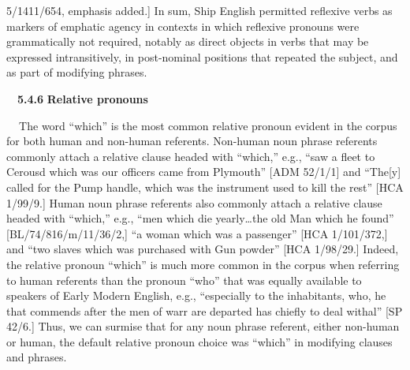 \begin{styleStandard}
5/1411/654, emphasis added.] In sum, Ship English permitted reflexive verbs as markers of emphatic agency in contexts in which reflexive pronouns were grammatically not required, notably as direct objects in verbs that may be expressed intransitively, in post-nominal positions that repeated the subject, and as part of modifying phrases. 
\end{styleStandard}


\begin{styleStandard}
\ \ \textbf{5.4.6} \textbf{Relative pronouns}
\end{styleStandard}


\begin{styleStandard}
\textbf{\ \ }The word “which” is the most common relative pronoun evident in the corpus for both human and non-human referents. Non-human noun phrase referents commonly attach a relative clause headed with “which,” e.g., “saw a fleet to Cerousd which was our officers came from Plymouth” [ADM 52/1/1] and “The[y] called for the Pump handle, which was the instrument used to kill the rest” [HCA 1/99/9.] Human noun phrase referents also commonly attach a relative clause headed with “which,” e.g., “men which die yearly…the old Man which he found” [BL/74/816/m/11/36/2,] “a woman which was a passenger” [HCA 1/101/372,] and “two slaves which was purchased with Gun powder” [HCA 1/98/29.] Indeed, the relative pronoun “which” is much more common in the corpus when referring to human referents than the pronoun “who” that was equally available to speakers of Early Modern English, e.g., “especially to the inhabitants, who, he that commends after the men of warr are departed has chiefly to deal withal” [SP 42/6.] Thus, we can surmise that for any noun phrase referent, either non-human or human, the default relative pronoun choice was “which” in modifying clauses and phrases. 
\end{styleStandard}


